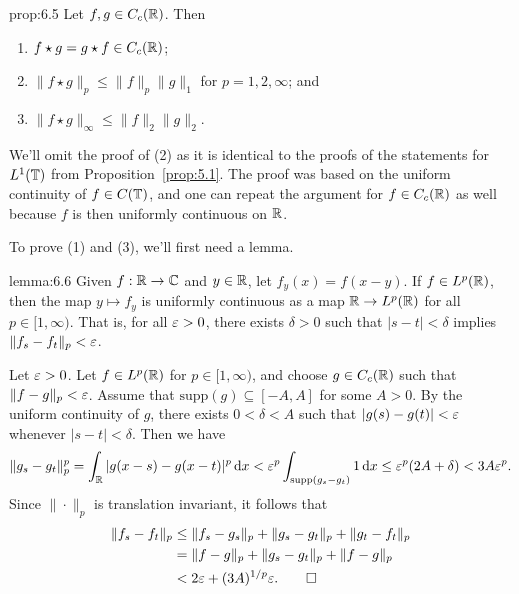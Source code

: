 \begin{prop}{prop:6.5}
    Let $f, g \in C_c(\mathbb{R})$. Then 
    \begin{enumerate}[(1)]
        \item $f \star g = g \star f \in C_c(\mathbb{R})$; 
        \item $\|f \star g\|_p \leq \|f\|_p \|g\|_1$ for $p = 1, 2, \infty$; and 
        \item $\|f \star g\|_\infty \leq \|f\|_2 \|g\|_2$. 
    \end{enumerate}
\end{prop}

We'll omit the proof of (2) as it is identical to the proofs of the 
statements for $L^1(\mathbb{T})$ from Proposition~\ref{prop:5.1}. The proof 
was based on the uniform continuity of $f \in C(\mathbb{T})$, and one can 
repeat the argument for $f \in C_c(\mathbb{R})$ as well because $f$ is then 
uniformly continuous on $\mathbb{R}$. 

To prove (1) and (3), we'll first need a lemma. 

\begin{lemma}{lemma:6.6}
    Given $f : \mathbb{R} \to \mathbb{C}$ and $y \in \mathbb{R}$, let $f_y(x) = f(x-y)$. 
    If $f \in L^p(\mathbb{R})$, then the map $y \mapsto f_y$ is uniformly 
    continuous as a map $\mathbb{R} \to L^p(\mathbb{R})$ for all $p \in [1, \infty)$. 
    That is, for all $\varepsilon > 0$, there exists $\delta > 0$ such that 
    $|s - t| < \delta$ implies $\|f_s - f_t\|_p < \varepsilon$. 
\end{lemma}
\begin{pf}
    Let $\varepsilon > 0$. Let $f \in L^p(\mathbb{R})$ for $p \in [1, \infty)$, and choose 
    $g \in C_c(\mathbb{R})$ such that $\|f - g\|_p < \varepsilon$. Assume that 
    $\text{supp}(g) \subseteq [-A, A]$ for some $A > 0$. 
    By the uniform continuity of $g$, there exists $0 < \delta < A$ 
    such that $|g(s) - g(t)| < \varepsilon$ whenever $|s - t| < \delta$. Then we 
    have 
    \[ \|g_s - g_t\|_p^p = \int_{\mathbb{R}} |g(x-s) - g(x-t)|^p\,\mathrm{d} x 
    < \varepsilon^p \int_{\text{supp}(g_s-g_t)} 1\,\mathrm{d} x \leq \varepsilon^p(2A + \delta) 
    < 3A \varepsilon^p. \] 
    Since $\|\cdot\|_p$ is translation invariant, it follows that 
    \begin{align*}
        \|f_s - f_t\|_p &\leq \|f_s - g_s\|_p + \|g_s - g_t\|_p 
        + \|g_t - f_t\|_p \\ 
        &= \|f - g\|_p + \|g_s - g_t\|_p + \|f - g\|_p \\ 
        &< 2\varepsilon + (3A)^{1/p} \varepsilon. \qedhere 
    \end{align*} 
\end{pf}

